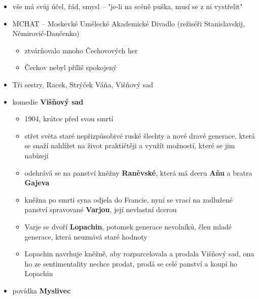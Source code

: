 \begin{itemize}
\begin{itemize}
	\item vše má svůj účel, řád, smysl -- "je-li na scéně puška, musí se z ní vystřelit"
	\item MCHAT -- Moskevké Umělecké Akademické Divadlo (režiséři Stanislavskij, Němirovič-Dančenko)
		\begin{itemize}
		\item ztvárňovalo mnoho Čechovových her
		\item Čechov nebyl příliš spokojený
		\end{itemize}
	\item Tři sestry, Racek, Strýček Váňa, Višňový sad
	\item komedie \textbf{Višňový sad}
		\begin{itemize}
		\item 1904, krátce před svou smrtí
		\item střet světa staré nepřizpůsobivé ruské šlechty a nové dravé generace, která se snaží nahlížet na život praktičtěji a využít možností, které se jim nabízejí
		\item odehrává se na panství kněžny \textbf{Raněvské}, která má dceru \textbf{Aňu} a bratra \textbf{Gajeva}
		\item kněžna po smrti syna odjela do Francie, nyní se vrací na zadlužené panství spravované \textbf{Varjou}, její nevlastní dcerou
		\item Varje se dvoří \textbf{Lopachin}, potomek generace nevolníků, člen mladé generace, která neuznává staré hodnoty 
		\item Lopachin navrhuje kněžně, aby rozparcelovala a prodala Višňový sad, ona ho ze sentimentality nechce prodat, prodá se celé panství a koupí ho Lopachin
		\end{itemize}
	\item povídka \textbf{Myslivec}
	\end{itemize}

\end{itemize}



